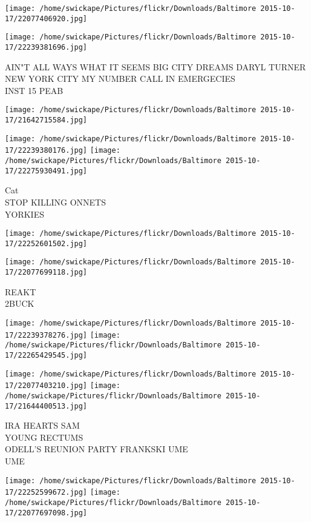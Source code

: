 \documentclass[10pt,letterpaper]{article}
\begin{document}
\texttt{[image: /home/swickape/Pictures/flickr/Downloads/Baltimore 2015-10-17/22077406920.jpg]}

\vspace{0.25in}
\texttt{[image: /home/swickape/Pictures/flickr/Downloads/Baltimore 2015-10-17/22239381696.jpg]}

AIN"T ALL WAYS WHAT IT SEEMS BIG CITY DREAMS DARYL TURNER NEW YORK CITY MY NUMBER CALL IN EMERGECIES\\
INST 15 PEAB
\pagebreak

\texttt{[image: /home/swickape/Pictures/flickr/Downloads/Baltimore 2015-10-17/21642715584.jpg]}

\vspace{0.25in}
\texttt{[image: /home/swickape/Pictures/flickr/Downloads/Baltimore 2015-10-17/22239380176.jpg]}
\texttt{[image: /home/swickape/Pictures/flickr/Downloads/Baltimore 2015-10-17/22275930491.jpg]}

Cat\\
STOP KILLING ONNETS\\
YORKIES
\pagebreak

\texttt{[image: /home/swickape/Pictures/flickr/Downloads/Baltimore 2015-10-17/22252601502.jpg]}

\vspace{0.25in}
\texttt{[image: /home/swickape/Pictures/flickr/Downloads/Baltimore 2015-10-17/22077699118.jpg]}

REAKT\\
2BUCK
\pagebreak

\texttt{[image: /home/swickape/Pictures/flickr/Downloads/Baltimore 2015-10-17/22239378276.jpg]}
\texttt{[image: /home/swickape/Pictures/flickr/Downloads/Baltimore 2015-10-17/22265429545.jpg]}

\texttt{[image: /home/swickape/Pictures/flickr/Downloads/Baltimore 2015-10-17/22077403210.jpg]}
\texttt{[image: /home/swickape/Pictures/flickr/Downloads/Baltimore 2015-10-17/21644400513.jpg]}

IRA HEARTS SAM\\
YOUNG RECTUMS\\
ODELL'S REUNION PARTY FRANKSKI UME\\
UME
\pagebreak

\texttt{[image: /home/swickape/Pictures/flickr/Downloads/Baltimore 2015-10-17/22252599672.jpg]}
\texttt{[image: /home/swickape/Pictures/flickr/Downloads/Baltimore 2015-10-17/22077697098.jpg]}
\end{document}
